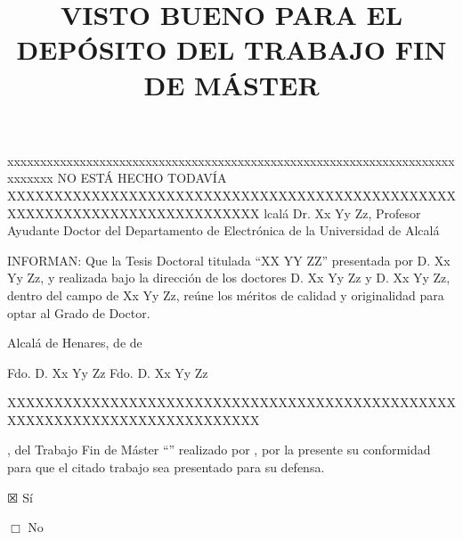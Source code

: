 %

\title{VISTO BUENO \MakeUppercase{\mybookDelOrDeLos{}
    \mybookTutorOrTutores} PARA EL DEPÓSITO DEL TRABAJO FIN DE MÁSTER} 
\date{}                                            %


{\Large
\maketitle 

\thispagestyle{empty}

\vspace{1cm}


xxxxxxxxxxxxxxxxxxxxxxxxxxxxxxxxxxxxxxxxxxxxxxxxxxxxxxxxxxxxxxxxxxxxxxxxxxx
NO ESTÁ HECHO TODAVÍA
XXXXXXXXXXXXXXXXXXXXXXXXXXXXXXXXXXXXXXXXXXXXXXXXXXXXXXXXXXXXXXXXXXXXXXXXXXX
lcalá
Dr. Xx Yy Zz, Profesor Ayudante Doctor del Departamento de Electrónica de la Universidad de Alcalá




INFORMAN: Que la Tesis Doctoral titulada ``XX YY ZZ'' presentada por D. Xx
Yy Zz, y realizada bajo la dirección de los doctores D. Xx Yy Zz y D. Xx
Yy Zz, dentro del campo de Xx Yy Zz, reúne los méritos de calidad y
originalidad para optar al Grado de Doctor.


	Alcalá de Henares,          de                      de 






	Fdo. D.  Xx Yy Zz                                       Fdo. D.  Xx Yy Zz

XXXXXXXXXXXXXXXXXXXXXXXXXXXXXXXXXXXXXXXXXXXXXXXXXXXXXXXXXXXXXXXXXXXXXXXXXXX

\mybookadvisorsConDon, \mybookTutorOrTutores{} del Trabajo Fin de Máster
``\mybooktitle'' realizado por \donOrDonaAutor{} \mybookauthor, por la
presente \mybookDaOrDan{} su conformidad para que el citado trabajo sea
presentado para su defensa.

\vspace{1cm}

$\XBox$ Sí

\vspace{0.5cm}

$\Box$ No

\vspace{2cm}


\vspace{4cm}


}


